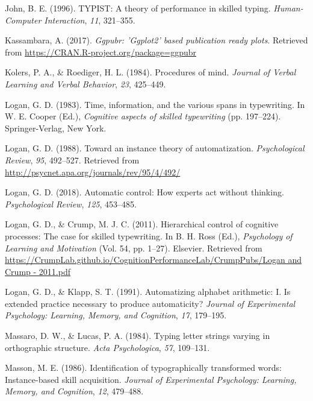 \documentclass[,man,donotrepeattitle,floatsintext]{apa6}
\begin{document}
\leavevmode\hypertarget{ref-john_typist:_1996}{}%
John, B. E. (1996). TYPIST: A theory of performance in skilled typing. \emph{Human-Computer Interaction}, \emph{11}, 321--355.

\leavevmode\hypertarget{ref-R-ggpubr}{}%
Kassambara, A. (2017). \emph{Ggpubr: 'Ggplot2' based publication ready plots}. Retrieved from \url{https://CRAN.R-project.org/package=ggpubr}

\leavevmode\hypertarget{ref-KolersProceduresmind1984}{}%
Kolers, P. A., \& Roediger, H. L. (1984). Procedures of mind. \emph{Journal of Verbal Learning and Verbal Behavior}, \emph{23}, 425--449.

\leavevmode\hypertarget{ref-logan_span_1983}{}%
Logan, G. D. (1983). Time, information, and the various spans in typewriting. In W. E. Cooper (Ed.), \emph{Cognitive aspects of skilled typewriting} (pp. 197--224). Springer-Verlag, New York.

\leavevmode\hypertarget{ref-logan_toward_1988}{}%
Logan, G. D. (1988). Toward an instance theory of automatization. \emph{Psychological Review}, \emph{95}, 492--527. Retrieved from \url{http://psycnet.apa.org/journals/rev/95/4/492/}

\leavevmode\hypertarget{ref-logan_2018}{}%
Logan, G. D. (2018). Automatic control: How experts act without thinking. \emph{Psychological Review}, \emph{125}, 453--485.

\leavevmode\hypertarget{ref-logan_hierarchical_2011}{}%
Logan, G. D., \& Crump, M. J. C. (2011). Hierarchical control of cognitive processes: The case for skilled typewriting. In B. H. Ross (Ed.), \emph{Psychology of Learning and Motivation} (Vol. 54, pp. 1--27). Elsevier. Retrieved from \href{https://CrumpLab.github.io/CognitionPerformanceLab/CrumpPubs/Logan\%20and\%20Crump\%20-\%202011.pdf}{https://CrumpLab.github.io/CognitionPerformanceLab/CrumpPubs/Logan and Crump - 2011.pdf}

\leavevmode\hypertarget{ref-logan_automatizing_1991}{}%
Logan, G. D., \& Klapp, S. T. (1991). Automatizing alphabet arithmetic: I. Is extended practice necessary to produce automaticity? \emph{Journal of Experimental Psychology: Learning, Memory, and Cognition}, \emph{17}, 179--195.

\leavevmode\hypertarget{ref-massaro_typing_1984}{}%
Massaro, D. W., \& Lucas, P. A. (1984). Typing letter strings varying in orthographic structure. \emph{Acta Psychologica}, \emph{57}, 109--131.

\leavevmode\hypertarget{ref-MassonIdentificationtypographicallytransformed1986}{}%
Masson, M. E. (1986). Identification of typographically transformed words: Instance-based skill acquisition. \emph{Journal of Experimental Psychology: Learning, Memory, and Cognition}, \emph{12}, 479--488.
\end{document}
